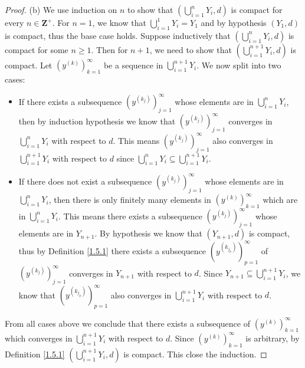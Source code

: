 \begin{proof}{(b)}
    We use induction on \(n\) to show that \((\bigcup_{i = 1}^n Y_i, d)\) is compact for every \(n \in \mathbf{Z}^+\).
    For \(n = 1\), we know that \(\bigcup_{i = 1}^1 Y_i = Y_1\) and by hypothesis \((Y_1, d)\) is compact, thus the base case holds.
    Suppose inductively that \((\bigcup_{i = 1}^n Y_i, d)\) is compact for some \(n \geq 1\).
    Then for \(n + 1\), we need to show that \((\bigcup_{i = 1}^{n + 1} Y_i, d)\) is compact.
    Let \((y^{(k)})_{k = 1}^\infty\) be a sequence in \(\bigcup_{i = 1}^{n + 1} Y_i\).
    We now split into two cases:
    \begin{itemize}
        \item If there exists a subsequence \((y^{(k_j)})_{j = 1}^\infty\) whose elements are in \(\bigcup_{i = 1}^n Y_i\), then by induction hypothesis we know that \((y^{(k_j)})_{j = 1}^\infty\) converges in \(\bigcup_{i = 1}^n Y_i\) with respect to \(d\).
              This means \((y^{(k_j)})_{j = 1}^\infty\) also converges in \(\bigcup_{i = 1}^{n + 1} Y_i\) with respect to \(d\) since \(\bigcup_{i = 1}^n Y_i \subseteq \bigcup_{i = 1}^{n + 1} Y_i\).
        \item If there does not exist a subsequence \((y^{(k_j)})_{j = 1}^\infty\) whose elements are in \(\bigcup_{i = 1}^n Y_i\), then there is only finitely many elements in \((y^{(k)})_{k = 1}^\infty\) which are in \(\bigcup_{i = 1}^n Y_i\).
              This means there exists a subsequence \((y^{(k_j)})_{j = 1}^\infty\) whose elements are in \(Y_{n + 1}\).
              By hypothesis we know that \((Y_{n + 1}, d)\) is compact, thus by Definition \ref{1.5.1} there exists a subsequence \((y^{(k_{j_p})})_{p = 1}^\infty\) of \((y^{(k_j)})_{j = 1}^\infty\) converges in \(Y_{n + 1}\) with respect to \(d\).
              Since \(Y_{n + 1} \subseteq \bigcup_{i = 1}^{n + 1} Y_i\), we know that \((y^{(k_{j_p})})_{p = 1}^\infty\) also converges in \(\bigcup_{i = 1}^{n + 1} Y_i\) with respect to \(d\).
    \end{itemize}
    From all cases above we conclude that there exists a subsequence of \((y^{(k)})_{k = 1}^\infty\) which converges in \(\bigcup_{i = 1}^{n + 1} Y_i\) with respect to \(d\).
    Since \((y^{(k)})_{k = 1}^\infty\) is arbitrary, by Definition \ref{1.5.1} \((\bigcup_{i = 1}^{n + 1} Y_i, d)\) is compact.
    This close the induction.
\end{proof}

